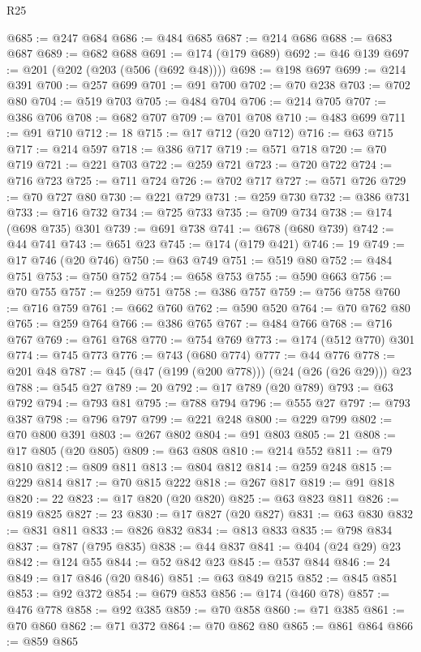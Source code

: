 \begin{lexlean}{R25}
\begin{coremodule}
@685 := @247 @684
@686 := @484 @685
@687 := @214 @686
@688 := @683 @687
@689 := @682 @688
@691 := @174 (@179 @689)
@692 := @46 @139
@697 := @201 (@202 (@203 (@506 (@692 @48))))
@698 := @198 @697
@699 := @214 @391
@700 := @257 @699
@701 := @91 @700
@702 := @70 @238
@703 := @702 @80
@704 := @519 @703
@705 := @484 @704
@706 := @214 @705
@707 := @386 @706
@708 := @682 @707
@709 := @701 @708
@710 := @483 @699
@711 := @91 @710
@712 := 18
@715 := @17 @712 (@20 @712)
@716 := @63 @715
@717 := @214 @597
@718 := @386 @717
@719 := @571 @718
@720 := @70 @719
@721 := @221 @703
@722 := @259 @721
@723 := @720 @722
@724 := @716 @723
@725 := @711 @724
@726 := @702 @717
@727 := @571 @726
@729 := @70 @727 @80
@730 := @221 @729
@731 := @259 @730
@732 := @386 @731
@733 := @716 @732
@734 := @725 @733
@735 := @709 @734
@738 := @174 (@698 @735) @301
@739 := @691 @738
@741 := @678 (@680 @739)
@742 := @44 @741
@743 := @651 @23
@745 := @174 (@179 @421)
@746 := 19
@749 := @17 @746 (@20 @746)
@750 := @63 @749
@751 := @519 @80
@752 := @484 @751
@753 := @750 @752
@754 := @658 @753
@755 := @590 @663
@756 := @70 @755
@757 := @259 @751
@758 := @386 @757
@759 := @756 @758
@760 := @716 @759
@761 := @662 @760
@762 := @590 @520
@764 := @70 @762 @80
@765 := @259 @764
@766 := @386 @765
@767 := @484 @766
@768 := @716 @767
@769 := @761 @768
@770 := @754 @769
@773 := @174 (@512 @770) @301
@774 := @745 @773
@776 := @743 (@680 @774)
@777 := @44 @776
@778 := @201 @48
@787 := @45 (@47 (@199 (@200 @778))) (@24 (@26 (@26 @29))) @23
@788 := @545 @27
@789 := 20
@792 := @17 @789 (@20 @789)
@793 := @63 @792
@794 := @793 @81
@795 := @788 @794
@796 := @555 @27
@797 := @793 @387
@798 := @796 @797
@799 := @221 @248
@800 := @229 @799
@802 := @70 @800 @391
@803 := @267 @802
@804 := @91 @803
@805 := 21
@808 := @17 @805 (@20 @805)
@809 := @63 @808
@810 := @214 @552
@811 := @79 @810
@812 := @809 @811
@813 := @804 @812
@814 := @259 @248
@815 := @229 @814
@817 := @70 @815 @222
@818 := @267 @817
@819 := @91 @818
@820 := 22
@823 := @17 @820 (@20 @820)
@825 := @63 @823 @811
@826 := @819 @825
@827 := 23
@830 := @17 @827 (@20 @827)
@831 := @63 @830
@832 := @831 @811
@833 := @826 @832
@834 := @813 @833
@835 := @798 @834
@837 := @787 (@795 @835)
@838 := @44 @837
@841 := @404 (@24 @29) @23
@842 := @124 @55
@844 := @52 @842 @23
@845 := @537 @844
@846 := 24
@849 := @17 @846 (@20 @846)
@851 := @63 @849 @215
@852 := @845 @851
@853 := @92 @372
@854 := @679 @853
@856 := @174 (@460 @78)
@857 := @476 @778
@858 := @92 @385
@859 := @70 @858
@860 := @71 @385
@861 := @70 @860
@862 := @71 @372
@864 := @70 @862 @80
@865 := @861 @864
@866 := @859 @865

\end{coremodule}
\end{lexlean}
